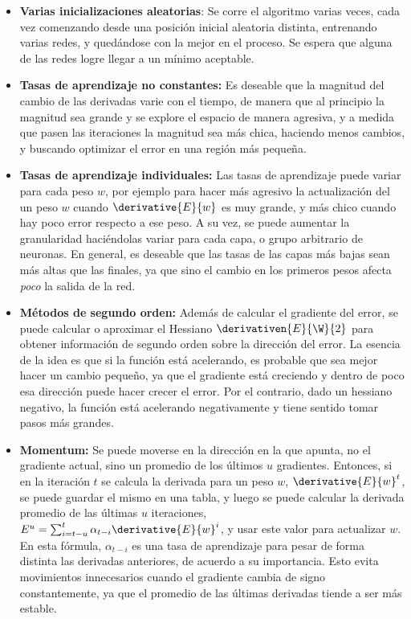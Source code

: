 \begin{itemize}
\item \textbf{Varias inicializaciones aleatorias}: Se corre el algoritmo varias veces, cada vez comenzando desde una posición inicial aleatoria distinta, entrenando varias redes, y quedándose con la mejor en el proceso. Se espera que alguna de las redes logre llegar a un mínimo aceptable.

\item \textbf{Tasas de aprendizaje no constantes:} Es deseable que la magnitud del cambio de las derivadas varie con el tiempo, de manera que al principio la magnitud sea grande y se explore el espacio de manera agresiva, y a medida que pasen las iteraciones la magnitud sea más chica, haciendo menos cambios, y buscando optimizar el error en una región más pequeña. 

\item \textbf{Tasas de aprendizaje individuales:} Las tasas de aprendizaje puede variar para cada peso $w$, por ejemplo para hacer más agresivo la actualización del un peso $w$ cuando $\derivative{E}{w}$ es muy grande, y más chico cuando hay poco error respecto a ese peso. A su vez, se puede aumentar la granularidad haciéndolas variar para cada capa, o grupo arbitrario de neuronas. En general, es deseable que las tasas de las capas más bajas sean más altas que las finales, ya que sino el cambio en los primeros pesos afecta \textit{poco} la salida de la red.  

\item \textbf{Métodos de segundo orden:} Además de calcular el gradiente del error, se puede calcular o aproximar el Hessiano $\derivativen{E}{\W}{2}$ para obtener información de segundo orden sobre la dirección del error. La esencia de la idea es que si la función está acelerando, es probable que sea mejor hacer un cambio pequeño, ya que el gradiente está creciendo y dentro de poco esa dirección puede hacer crecer el error. Por el contrario, dado un hessiano negativo, la función está acelerando negativamente y tiene sentido tomar pasos más grandes.

\item \textbf{Momentum:} Se puede moverse en la dirección en la que apunta, no el gradiente actual, sino un promedio de los últimos  $u$ gradientes. Entonces, si en la iteración $t$ se calcula la derivada para un peso $w$, $\derivative{E}{w}^t$, se puede guardar el mismo en una tabla, y luego se puede calcular la derivada promedio de las últimas $u$ iteraciones, $E^u= \sum_{i=t-u}^{t} \alpha_{t-i} \derivative{E}{w}^i$, y usar este valor para actualizar $w$. En esta fórmula, $\alpha_{t-i}$ es una tasa de aprendizaje para pesar de forma distinta las derivadas anteriores, de acuerdo a su importancia. Esto evita movimientos innecesarios cuando el gradiente cambia de signo constantemente, ya que el promedio de las últimas derivadas tiende a ser más estable.


\end{itemize}

